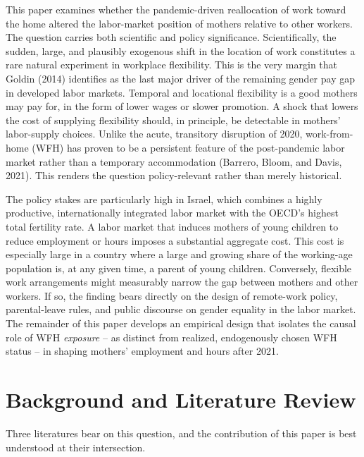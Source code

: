 \documentclass[11pt]{article}
\begin{document}
This paper examines whether the pandemic-driven reallocation of work toward the home altered the labor-market position of mothers relative to other workers. The question carries both scientific and policy significance. Scientifically, the sudden, large, and plausibly exogenous shift in the location of work constitutes a rare natural experiment in workplace flexibility. This is the very margin that Goldin (2014) identifies as the last major driver of the remaining gender pay gap in developed labor markets. Temporal and locational flexibility is a good mothers may pay for, in the form of lower wages or slower promotion. A shock that lowers the cost of supplying flexibility should, in principle, be detectable in mothers' labor-supply choices. Unlike the acute, transitory disruption of 2020, work-from-home (WFH) has proven to be a persistent feature of the post-pandemic labor market rather than a temporary accommodation (Barrero, Bloom, and Davis, 2021). This renders the question policy-relevant rather than merely historical.

The policy stakes are particularly high in Israel, which combines a highly productive, internationally integrated labor market with the OECD's highest total fertility rate. A labor market that induces mothers of young children to reduce employment or hours imposes a substantial aggregate cost. This cost is especially large in a country where a large and growing share of the working-age population is, at any given time, a parent of young children. Conversely, flexible work arrangements might measurably narrow the gap between mothers and other workers. If so, the finding bears directly on the design of remote-work policy, parental-leave rules, and public discourse on gender equality in the labor market. The remainder of this paper develops an empirical design that isolates the causal role of WFH \emph{exposure} -- as distinct from realized, endogenously chosen WFH status -- in shaping mothers' employment and hours after 2021.

\section{Background and Literature Review}

Three literatures bear on this question, and the contribution of this paper is best understood at their intersection.
\end{document}
